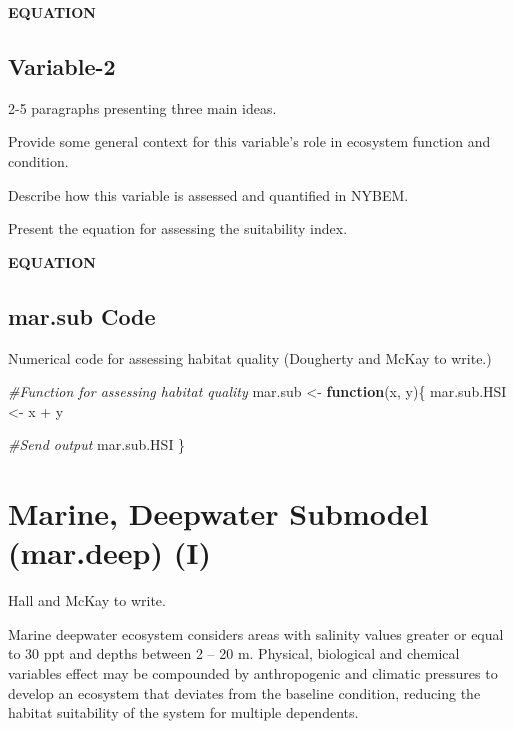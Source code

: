 \documentclass[
]{book}
\newenvironment{Shaded}{\begin{snugshade}}{\end{snugshade}}
\newcommand{\CommentTok}[1]{\textcolor[rgb]{0.56,0.35,0.01}{\textit{#1}}}
\newcommand{\ControlFlowTok}[1]{\textcolor[rgb]{0.13,0.29,0.53}{\textbf{#1}}}
\newcommand{\NormalTok}[1]{#1}
\newcommand{\OtherTok}[1]{\textcolor[rgb]{0.56,0.35,0.01}{#1}}
\newcommand{\SpecialCharTok}[1]{\textcolor[rgb]{0.00,0.00,0.00}{#1}}
\begin{document}
\textbf{EQUATION}

\hypertarget{variable-2-1}{%
\subsection{Variable-2}\label{variable-2-1}}

2-5 paragraphs presenting three main ideas.

Provide some general context for this variable's role in ecosystem function and condition.

Describe how this variable is assessed and quantified in NYBEM.

Present the equation for assessing the suitability index.

\textbf{EQUATION}

\hypertarget{mar.sub-code}{%
\subsection{mar.sub Code}\label{mar.sub-code}}

Numerical code for assessing habitat quality ({Dougherty and McKay to write.})

\begin{Shaded}
\begin{Highlighting}[]
\CommentTok{\#Function for assessing habitat quality}
\NormalTok{mar.sub }\OtherTok{\textless{}{-}} \ControlFlowTok{function}\NormalTok{(x, y)\{}
\NormalTok{  mar.sub.HSI }\OtherTok{\textless{}{-}}\NormalTok{ x }\SpecialCharTok{+}\NormalTok{ y}

  \CommentTok{\#Send output}
\NormalTok{  mar.sub.HSI}
\NormalTok{\}}
\end{Highlighting}
\end{Shaded}

\hypertarget{marine-deepwater-submodel-mar.deep-i}{%
\section{Marine, Deepwater Submodel (mar.deep) (I)}\label{marine-deepwater-submodel-mar.deep-i}}

{Hall and McKay to write.}

Marine deepwater ecosystem considers areas with salinity values greater or equal to 30 ppt and depths between 2 -- 20 m. Physical, biological and chemical variables effect may be compounded by anthropogenic and climatic pressures to develop an ecosystem that deviates from the baseline condition, reducing the habitat suitability of the system for multiple dependents.
\end{document}
